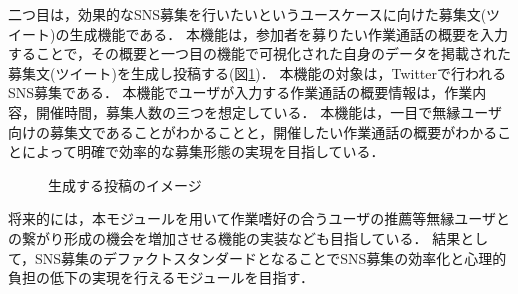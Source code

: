二つ目は，効果的なSNS募集を行いたいというユースケースに向けた募集文(ツイート)の生成機能である．
本機能は，参加者を募りたい作業通話の概要を入力することで，その概要と一つ目の機能で可視化された自身のデータを掲載された募集文(ツイート)を生成し投稿する(図\ref{fig:tweet_image})．
本機能の対象は，Twitterで行われるSNS募集である．
本機能でユーザが入力する作業通話の概要情報は，作業内容，開催時間，募集人数の三つを想定している．
本機能は，一目で無縁ユーザ向けの募集文であることがわかることと，開催したい作業通話の概要がわかることによって明確で効率的な募集形態の実現を目指している．

\begin{figure}
    \centering
    \caption{生成する投稿のイメージ}
    \label{fig:tweet_image}
\end{figure}

将来的には，本モジュールを用いて作業嗜好の合うユーザの推薦等無縁ユーザとの繋がり形成の機会を増加させる機能の実装なども目指している．
結果として，SNS募集のデファクトスタンダードとなることでSNS募集の効率化と心理的負担の低下の実現を行えるモジュールを目指す．
